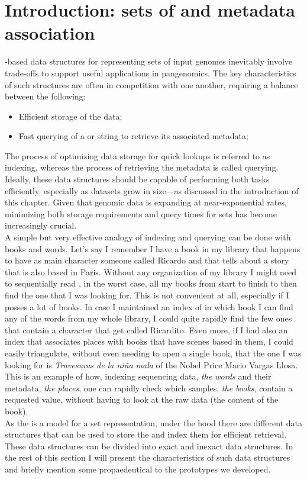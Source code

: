 
\section{Introduction: sets of \kmers and metadata association}
\kmer-based data structures  for representing sets of input genomes inevitably involve trade-offs to support useful applications in pangenomics.  The key characteristics of such structures are often in competition with one another, requiring a balance between the following:
\begin{itemize}
	\item Efficient storage of the data;
	\item Fast querying of a \kmer or string to retrieve its associated metadata;
\end{itemize}
The process of optimizing data storage for quick lookups is referred to as indexing, whereas the process of retrieving the metadata is called querying. Ideally, these data structures should be capable of performing both tasks efficiently, especially as datasets grow in size—as discussed in the introduction of this chapter. Given that genomic data is expanding at near-exponential rates, minimizing both storage requirements and query times for \kmer sets has become increasingly crucial.\\
A simple but very effective analogy of indexing and querying can be done with books and words.
Let's say I remember I have a book in my library that happens to have as main character someone called Ricardo and that tells about a story that is also based in Paris. Without any organization of my library I might need to sequentially read , in the worst case, all my books from start to finish to then find the one that I was looking for. This is not convenient at all, especially if I posses a lot of books. In case I maintained an index of in which book I can find any of the words from my whole library, I could quite rapidly find the few ones that contain a character that get called Ricardito. Even more, if I had also an index that associates places with books that have scenes based in them, I could easily triangulate, without even needing to open a single book, that the one I was looking for is \emph{Travesuras de la niña mala} of the Nobel Price  Mario Vargas Llosa.
This is an example of how, indexing sequencing data, \emph{the words} and their metadata, \emph{the places}, one can rapidly check which samples, \emph{the books}, contain a requested value, without having to look at the raw data (the content of the book).\\
As the \dbg is a model for a \kmer set representation, under the hood there are different data structures that can be used to store the \kmers and index them for efficient retrieval. These data structures can be divided into exact and inexact data structures. In the rest of this section I will present the characteristics of such data structures and briefly mention some propaedeutical to the prototypes we developed.

